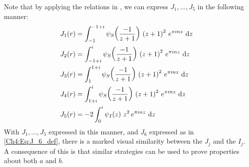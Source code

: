 Note that by applying the relations in , we can express $J_1, \ldots, J_5$ in the following manner:
\begin{align*}
    J_1(r) &= \int_{-1}^{-1 + i} \psi_S\of{\frac{-1}{z + 1}} \, \parenth{z + 1}^2 \, e^{\pi i n z} \, \diff{z} \\
    J_2(r) &= \int_{-1 + i}^{i} \psi_S\of{\frac{-1}{z + 1}} \, \parenth{z + 1}^2 \, e^{\pi i n z} \, \diff{z} \\
    J_3(r) &= \int_{1}^{1 + i} \psi_S\of{\frac{-1}{z + 1}} \, \parenth{z + 1}^2 \, e^{\pi i n z} \, \diff{z} \\
    J_4(r) &= \int_{1 + i}^{i} \psi_S\of{\frac{-1}{z + 1}} \, \parenth{z + 1}^2 \, e^{\pi i n z} \, \diff{z} \\
    J_5(r) &= -2 \int_{0}^{i} \psi_I\of{z} \, z^2 \, e^{\pi i n z} \, \diff{z}
\end{align*}
With $J_1, \ldots, J_5$ expressed in this manner, and $J_6$ expressed as in \eqref{Ch4:Eq:J_6_def}, there is a marked visual similarity between the $J_j$ and the $I_j$. A consequence of this is that similar strategies can be used to prove properties about both $a$ and $b$.